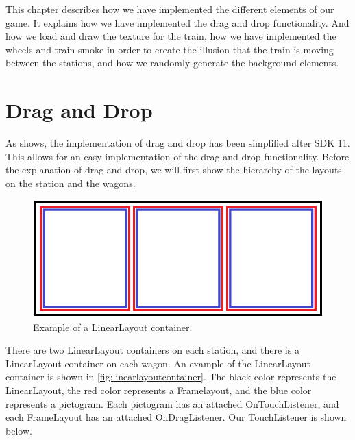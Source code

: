 This chapter describes how we have implemented the different elements of our game. It explains how we have implemented the drag and drop functionality. And how we load and draw the texture for the train, how we have implemented the wheels and train smoke in order to create the illusion that the train is moving between the stations, and how we randomly generate the background elements.

\section{Drag and Drop}
\label{sec:implementationdraganddrop}
As  shows, the implementation of drag and drop has been simplified after SDK 11. This allows for an easy implementation of the drag and drop functionality. Before the explanation of drag and drop, we will first show the hierarchy of the layouts on the station and the wagons.
\begin{figure}[H]
\centering
\includegraphics[width=0.9\linewidth]{img/layoutexample.png}%
\caption{Example of a LinearLayout container.}
\label{fig:linearlayoutcontainer}
\end{figure}
There are two LinearLayout containers on each station, and there is a LinearLayout container on each wagon. An example of the LinearLayout container is shown in \autoref{fig:linearlayoutcontainer}. The black color represents the LinearLayout, the red color represents a Framelayout, and the blue color represents a pictogram. Each pictogram has an attached OnTouchListener, and each FrameLayout has an attached OnDragListener. Our TouchListener is shown below.

